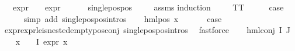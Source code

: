 \begin{isabellebody}
\ \ \ {\isachardoublequoteopen}expr{\isacharunderscore}{\kern0pt}{}\ {\isasymphi}\ {\isasymle}\ {}{\isachardoublequoteclose}\ {\isachardoublequoteopen}expr{\isacharunderscore}{\kern0pt}{}\ {\isasymphi}\ {\isasymle}\ {}{\isachardoublequoteclose}\isanewline
\ \ \ {\isachardoublequoteopen}single{\isacharunderscore}{\kern0pt}pos{\isacharunderscore}{\kern0pt}pos\ {\isasymphi}{\isachardoublequoteclose}\isanewline
%
\isadelimproof
\ \ %
\endisadelimproof
%
\isatagproof
{}\isamarkupfalse%
\ assms\isanewline
{}\isamarkupfalse%
{\isacharparenleft}{\kern0pt}induction\ {\isasymphi}{\isacharparenright}{\kern0pt}\isanewline
\ \ \isamarkupfalse%
\ TT\isanewline
\ \ \isamarkupfalse%
\ \isamarkupfalse%
\ {\isacharquery}{\kern0pt}case\ \isanewline
\ \ \ \ \isamarkupfalse%
\ {\isacharparenleft}{\kern0pt}simp\ add{\isacharcolon}{\kern0pt}\ single{\isacharunderscore}{\kern0pt}pos{\isacharunderscore}{\kern0pt}pos{\isachardot}{\kern0pt}intros{\isacharparenleft}{\kern0pt}{}{\isacharparenright}{\kern0pt}{\isacharparenright}{\kern0pt}\isanewline
{}\isamarkupfalse%
\isanewline
\ \ \isamarkupfalse%
\ {\isacharparenleft}{\kern0pt}hml{\isacharunderscore}{\kern0pt}pos\ x{}\ {\isasymphi}{\isacharparenright}{\kern0pt}\isanewline
\ \ \isamarkupfalse%
\ \isamarkupfalse%
\ {\isacharquery}{\kern0pt}case\ \isanewline
\ \ \ \ \isamarkupfalse%
\ expr{\isacharunderscore}{\kern0pt}{}{\isacharunderscore}{\kern0pt}expr{\isacharunderscore}{\kern0pt}{}{\isacharunderscore}{\kern0pt}le{\isacharunderscore}{\kern0pt}{}{\isacharunderscore}{\kern0pt}is{\isacharunderscore}{\kern0pt}nested{\isacharunderscore}{\kern0pt}empty{\isacharunderscore}{\kern0pt}pos{\isacharunderscore}{\kern0pt}conj\ single{\isacharunderscore}{\kern0pt}pos{\isacharunderscore}{\kern0pt}pos{\isachardot}{\kern0pt}intros{\isacharparenleft}{\kern0pt}{}{\isacharparenright}{\kern0pt}\ \isamarkupfalse%
\ fastforce\isanewline
{}\isamarkupfalse%
\isanewline
\ \ \isamarkupfalse%
\ {\isacharparenleft}{\kern0pt}hml{\isacharunderscore}{\kern0pt}conj\ I\ J\ {\isasymPhi}{\isacharparenright}{\kern0pt}\isanewline
\ \ \isamarkupfalse%
\ {\isachardoublequoteopen}{\isasymforall}x\ {\isasymin}\ {\isasymPhi}\ {\isacharbackquote}{\kern0pt}\ I{\isachardot}{\kern0pt}\ expr{\isacharunderscore}{\kern0pt}{}\ x\ {\isasymle}\ {}{\isachardoublequoteclose}\isanewline

\end{isabellebody}
